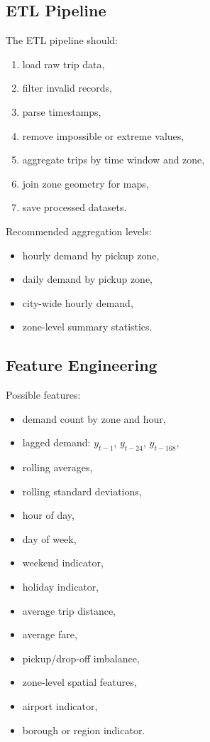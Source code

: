 \documentclass[11pt]{article}
\begin{document}
\subsection{ETL Pipeline}

The ETL pipeline should:

\begin{enumerate}
    \item load raw trip data,
    \item filter invalid records,
    \item parse timestamps,
    \item remove impossible or extreme values,
    \item aggregate trips by time window and zone,
    \item join zone geometry for maps,
    \item save processed datasets.
\end{enumerate}

Recommended aggregation levels:

\begin{itemize}
    \item hourly demand by pickup zone,
    \item daily demand by pickup zone,
    \item city-wide hourly demand,
    \item zone-level summary statistics.
\end{itemize}

\subsection{Feature Engineering}

Possible features:

\begin{itemize}
    \item demand count by zone and hour,
    \item lagged demand: $y_{t-1}$, $y_{t-24}$, $y_{t-168}$,
    \item rolling averages,
    \item rolling standard deviations,
    \item hour of day,
    \item day of week,
    \item weekend indicator,
    \item holiday indicator,
    \item average trip distance,
    \item average fare,
    \item pickup/drop-off imbalance,
    \item zone-level spatial features,
    \item airport indicator,
    \item borough or region indicator.
\end{itemize}
\end{document}
